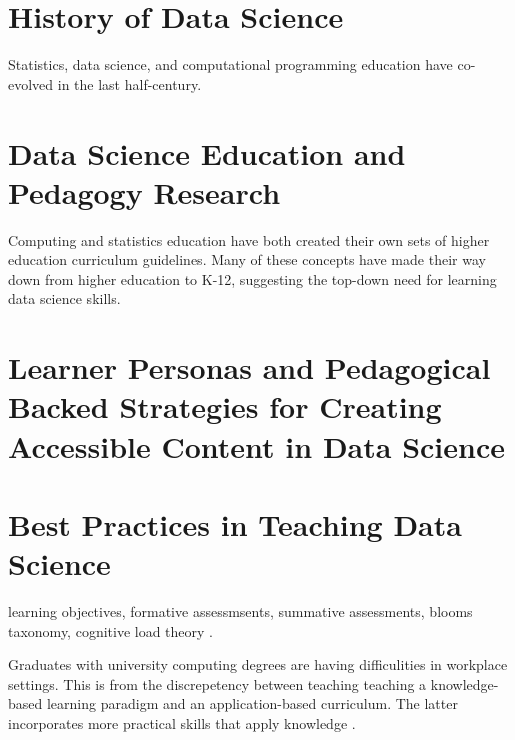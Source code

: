 \documentclass[../main.tex]{subfiles}
\begin{document}
    

    \section{History of Data Science}
        \label{se:intro-ds-history}

        Statistics, data science, and computational programming education
        have co-evolved in the last half-century.

        
        
        
        
        

    \section{Data Science Education and Pedagogy Research}
        \label{se:intro-ds-edu-ped}
    
        Computing and statistics education have both created their own sets of
        higher education curriculum guidelines.
        Many of these concepts have made their way down from higher education to K-12,
        suggesting the top-down need for learning data science skills.

        
        
        
        
    \section{Learner Personas and Pedagogical Backed Strategies for Creating Accessible Content in Data Science}
        \label{se:intro-personas}

        
        
    \section{Best Practices in Teaching Data Science}
        \label{se:intro-teaching-best-practices-ds}

        learning objectives, formative assessmsents, summative assessments, blooms taxonomy,
        cognitive load theory
        \cite{DonaldClarkPlan2020}.

        Graduates with university computing degrees are having difficulities in workplace settings.
        This is from the discrepetency between teaching teaching a knowledge-based learning paradigm and an application-based curriculum.
        The latter incorporates more practical skills that apply knowledge
        \cite{cc2005}.
\end{document}
